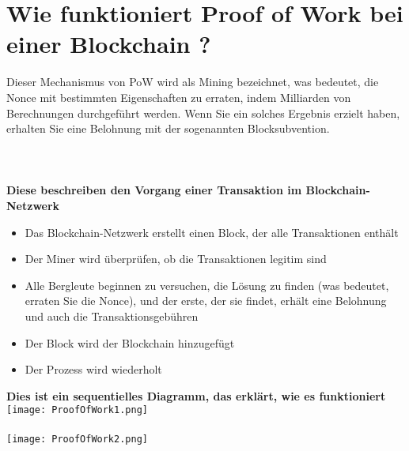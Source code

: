 \documentclass[ngerman]{scrreprt}
\begin{document}
\section{Wie funktioniert Proof of Work bei einer Blockchain ?}
Dieser Mechanismus von PoW wird als Mining bezeichnet, was bedeutet, die Nonce mit bestimmten Eigenschaften zu erraten, indem Milliarden von Berechnungen durchgeführt werden. Wenn Sie ein solches Ergebnis erzielt haben, erhalten Sie eine Belohnung mit der sogenannten Blocksubvention.\\ \\ \\ \\
\textbf{Diese beschreiben den Vorgang einer Transaktion im Blockchain-Netzwerk \\ }
\begin{itemize}
	\item{Das Blockchain-Netzwerk erstellt einen Block, der alle Transaktionen enthält}
	\item{Der Miner wird überprüfen, ob die Transaktionen legitim sind}
	\item{Alle Bergleute beginnen zu versuchen, die Lösung zu finden (was bedeutet, erraten Sie die Nonce), und der erste, der sie findet, erhält eine Belohnung und auch die Transaktionsgebühren}
	\item{Der Block wird der Blockchain hinzugefügt}
	\item{Der Prozess wird wiederholt \\}
	
\end{itemize}
\textbf{Dies ist ein sequentielles Diagramm, das erklärt, wie es funktioniert \\}
\texttt{[image: ProofOfWork1.png]} \\ \\
\texttt{[image: ProofOfWork2.png]}
\end{document}
